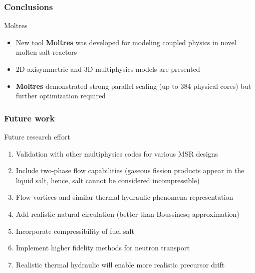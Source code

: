 \begin{frame}
  \frametitle{Conclusions}
		\begin{block}{Moltres}
		\begin{itemize}
		\item New tool \textbf{Moltres} was developed for modeling coupled physics in novel molten salt reactors
		\item 2D-axisymmetric and 3D multiphysics models are presented
		\item \textbf{Moltres} demonstrated strong parallel scaling (up to 384 physical cores) but further optimization required
        \end{itemize}
        \end{block}
        
\end{frame}

\begin{frame}
  \frametitle{Future work}       
              \begin{block}{Future research effort}
               \begin{enumerate}
                \item Validation with other multiphysics codes for various \gls{MSR} designs
                \item Include two-phase flow capabilities (gaseous fission products appear in the liquid salt, hence, salt cannot be considered incompressible)
                \item Flow vortices and similar thermal hydraulic phenomena representation
                \item Add realistic natural circulation (better than Boussinesq approximation)
                \item Incorporate compressibility of fuel salt
                \item Implement higher fidelity methods for neutron transport 
                \item Realistic thermal hydraulic will enable more realistic precursor drift
               \end{enumerate}
               \end{block}
\end{frame}

